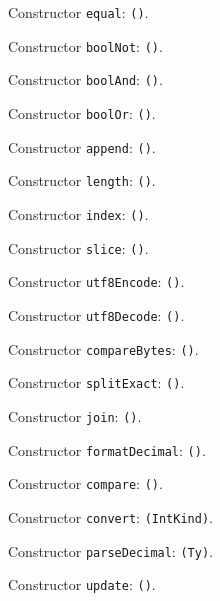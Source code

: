 \documentclass[11pt]{article}
\begin{document}
\noindent Constructor \texttt{equal}: \texttt{()}.\par
\noindent Constructor \texttt{boolNot}: \texttt{()}.\par
\noindent Constructor \texttt{boolAnd}: \texttt{()}.\par
\noindent Constructor \texttt{boolOr}: \texttt{()}.\par
\noindent Constructor \texttt{append}: \texttt{()}.\par
\noindent Constructor \texttt{length}: \texttt{()}.\par
\noindent Constructor \texttt{index}: \texttt{()}.\par
\noindent Constructor \texttt{slice}: \texttt{()}.\par
\noindent Constructor \texttt{utf8Encode}: \texttt{()}.\par
\noindent Constructor \texttt{utf8Decode}: \texttt{()}.\par
\noindent Constructor \texttt{compareBytes}: \texttt{()}.\par
\noindent Constructor \texttt{splitExact}: \texttt{()}.\par
\noindent Constructor \texttt{join}: \texttt{()}.\par
\noindent Constructor \texttt{formatDecimal}: \texttt{()}.\par
\noindent Constructor \texttt{compare}: \texttt{()}.\par
\noindent Constructor \texttt{convert}: \texttt{(IntKind)}.\par
\noindent Constructor \texttt{parseDecimal}: \texttt{(Ty)}.\par
\noindent Constructor \texttt{update}: \texttt{()}.\par
\end{document}
